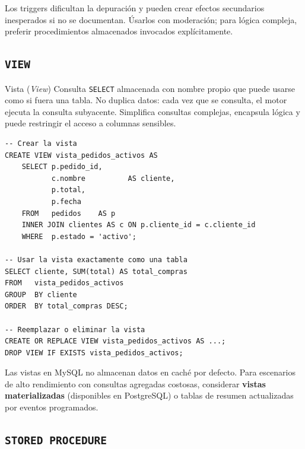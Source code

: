 \begin{nota}
  Los triggers dificultan la depuración y pueden crear efectos secundarios
  inesperados si no se documentan. Úsarlos con moderación; para lógica
  compleja, preferir procedimientos almacenados invocados explícitamente.
\end{nota}

\subsection{\texttt{VIEW}}

\begin{definicion}{Vista (\textit{View})}
  Consulta \texttt{SELECT} almacenada con nombre propio que puede usarse
  como si fuera una tabla. No duplica datos: cada vez que se consulta, el
  motor ejecuta la consulta subyacente. Simplifica consultas complejas,
  encapsula lógica y puede restringir el acceso a columnas sensibles.
\end{definicion}

\begin{lstlisting}[style=sql, caption={Creación y consulta de una vista}]
-- Crear la vista
CREATE VIEW vista_pedidos_activos AS
    SELECT p.pedido_id,
           c.nombre          AS cliente,
           p.total,
           p.fecha
    FROM   pedidos    AS p
    INNER JOIN clientes AS c ON p.cliente_id = c.cliente_id
    WHERE  p.estado = 'activo';

-- Usar la vista exactamente como una tabla
SELECT cliente, SUM(total) AS total_compras
FROM   vista_pedidos_activos
GROUP  BY cliente
ORDER  BY total_compras DESC;

-- Reemplazar o eliminar la vista
CREATE OR REPLACE VIEW vista_pedidos_activos AS ...;
DROP VIEW IF EXISTS vista_pedidos_activos;
\end{lstlisting}

\begin{nota}
  Las vistas en MySQL no almacenan datos en caché por defecto. Para
  escenarios de alto rendimiento con consultas agregadas costosas,
  considerar \textbf{vistas materializadas} (disponibles en PostgreSQL) o
  tablas de resumen actualizadas por eventos programados.
\end{nota}

\subsection{\texttt{STORED PROCEDURE}}

